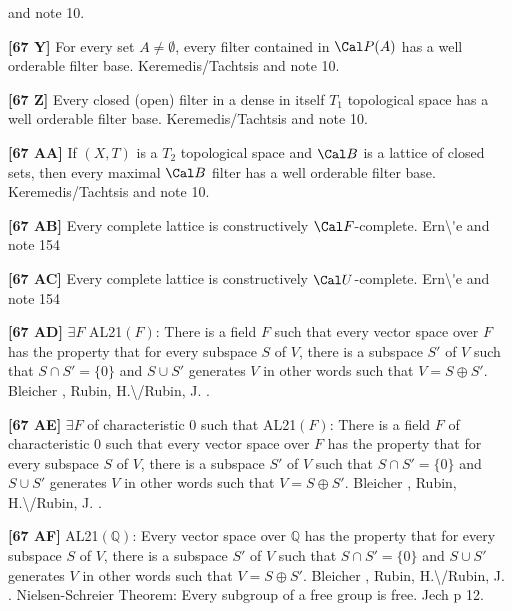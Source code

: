 and note 10.
\smallskip
\item{}{\bf [67 Y]} For every set $A\ne\emptyset$, every filter
contained in $\Cal P(A)$ has a well orderable filter base.
\ac{Keremedis/Tachtsis} \cite{2000} and note 10.
\smallskip
\item{}{\bf [67 Z]} Every closed (open) filter in a dense in itself
$T_1$ topological space has a well orderable filter base.
\ac{Keremedis/Tachtsis} \cite{2000} and note 10.
\smallskip
\item{}{\bf [67 AA]}  If $(X,T)$ is a $T_2$ topological space and
$\Cal B$ is a lattice of closed sets, then every maximal $\Cal B$
filter has a well orderable filter base.  \ac{Keremedis/Tachtsis}
\cite{2000} and note 10.
\smallskip
\item{}{\bf [67 AB]} Every complete lattice is constructively
$\Cal F$-complete.  \ac{Ern\'e} \cite{2000} and note 154
\smallskip
\item{}{\bf [67 AC]} Every complete lattice is constructively $\Cal
U$-complete.  \ac{Ern\'e} \cite{2000} and note 154
\smallskip
\item{}{\bf [67 AD]} $\exists F$ AL21$(F)$: There is a field $F$ such that
every vector space over $F$ has the property that for every subspace $S$
of $V$, there is a subspace $S'$ of $V$ such that $S \cap S' = \{ 0 \}$
and $S \cup S'$ generates $V$ in other words such that $V = S \oplus S'$.
\ac{Bleicher} \cite{1964}, \ac{Rubin, H.\/Rubin, J.} \cite{1985, pp.
122,123, theorems 6.35 and 6.36}.
\smallskip
\item{}{\bf [67 AE]} $\exists F$ of characteristic $0$ such that AL21$(F)$:
There is a field $F$ of characteristic $0$ such that every vector space
over $F$ has the property that for every subspace $S$ of $V$, there is a
subspace $S'$ of $V$ such that $S \cap S' = \{ 0 \}$ and $S \cup S'$
generates $V$ in other words such that $V = S \oplus S'$. \ac{Bleicher}
\cite{1964}, \ac{Rubin, H.\/Rubin, J.} \cite{1985, pp. 122,123, theorems
6.35 and 6.36}.
\smallskip
\item{}{\bf [67 AF]} AL21$(\mathbb Q)$: Every vector space over
$\mathbb Q$ has the property that for every subspace $S$ of $V$, there is
a subspace $S'$ of $V$ such that $S \cap S' = \{ 0 \}$ and $S \cup S'$
generates $V$ in other words such that $V = S \oplus S'$. \ac{Bleicher}
\cite{1964}, \ac{Rubin, H.\/Rubin, J.} \cite{1985, pp. 122,123, theorems
6.35 and 6.36}.
\medskip
{} Nielsen-Schreier Theorem: Every subgroup of a
free group is free.  \ac{Jech} \cite{1973b} p 12.
